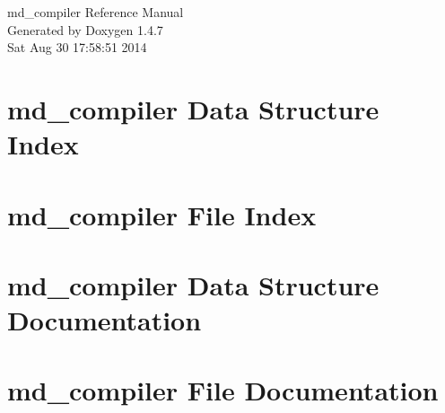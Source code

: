 \documentclass[letterpaper]{book}
\begin{document}
\begin{titlepage}
\vspace*{7cm}
\begin{center}
{\Large md\_\-compiler Reference Manual}\\
\vspace*{1cm}
{\large Generated by Doxygen 1.4.7}\\
\vspace*{0.5cm}
{\small Sat Aug 30 17:58:51 2014}\\
\end{center}
\end{titlepage}
\clearemptydoublepage
{}
\tableofcontents
\clearemptydoublepage
{}
\chapter{md\_\-compiler Data Structure Index}

\chapter{md\_\-compiler File Index}

\chapter{md\_\-compiler Data Structure Documentation}

\chapter{md\_\-compiler File Documentation}


\printindex
\end{document}
